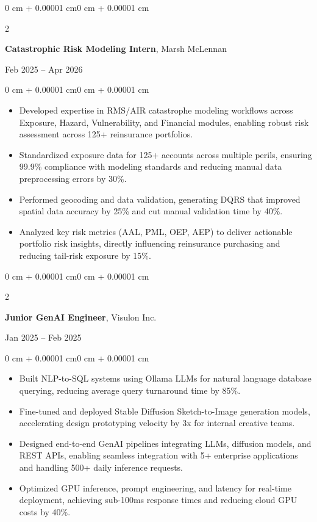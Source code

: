 \documentclass[10pt, letterpaper]{article}
\newenvironment{highlights}{
    \begin{itemize}[
        topsep=0.03 cm,
        parsep=0.02 cm,
        partopsep=0pt,
        itemsep=0.02 cm,
        leftmargin=0 cm + 8pt
    ]
}{
    \end{itemize}
}
\newenvironment{onecolentry}{
    \begin{adjustwidth}{0 cm + 0.00001 cm}{0 cm + 0.00001 cm}
}{
    \end{adjustwidth}
}
\newenvironment{twocolentry}[2][]{
    \onecolentry
    \def\secondColumn{#2}
    \setcolumnwidth{\fill, 3.5 cm}
    \begin{paracol}{2}
}{
    \switchcolumn \raggedleft \secondColumn
    \end{paracol}
    \endonecolentry
}
\begin{document}
    \begin{twocolentry}{Feb 2025 -- Apr 2026}
        \textbf{Catastrophic Risk Modeling Intern}, Marsh McLennan
    \end{twocolentry}
    \vspace{0.03 cm}
    \begin{onecolentry}
        \begin{highlights}
            \item Developed expertise in RMS/AIR catastrophe modeling workflows across Exposure, Hazard, Vulnerability, and Financial modules, enabling robust risk assessment across 125+ reinsurance portfolios.
            \item Standardized exposure data for 125+ accounts across multiple perils, ensuring 99.9\% compliance with modeling standards and reducing manual data preprocessing errors by 30\%.
            \item Performed geocoding and data validation, generating DQRS that improved spatial data accuracy by 25\% and cut manual validation time by 40\%.
            \item Analyzed key risk metrics (AAL, PML, OEP, AEP) to deliver actionable portfolio risk insights, directly influencing reinsurance purchasing and reducing tail-risk exposure by 15\%.
        \end{highlights}
    \end{onecolentry}

    \vspace{0.06 cm}

    \begin{twocolentry}{Jan 2025 -- Feb 2025}
        \textbf{Junior GenAI Engineer}, Visulon Inc.
    \end{twocolentry}
    \vspace{0.03 cm}
    \begin{onecolentry}
        \begin{highlights}
            \item Built NLP-to-SQL systems using Ollama LLMs for natural language database querying, reducing average query turnaround time by 85\%.
            \item Fine-tuned and deployed Stable Diffusion Sketch-to-Image generation models, accelerating design prototyping velocity by 3x for internal creative teams.
            \item Designed end-to-end GenAI pipelines integrating LLMs, diffusion models, and REST APIs, enabling seamless integration with 5+ enterprise applications and handling 500+ daily inference requests.
            \item Optimized GPU inference, prompt engineering, and latency for real-time deployment, achieving sub-100ms response times and reducing cloud GPU costs by 40\%.
        \end{highlights}
    \end{onecolentry}
\end{document}
